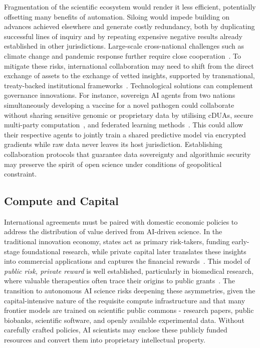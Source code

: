 \documentclass[11pt, a4paper, twocolumn, goog]{google}
\begin{document}
Fragmentation of the scientific ecosystem would render it less efficient, potentially offsetting many benefits of automation. Siloing would impede building on advances achieved elsewhere and generate costly redundancy, both by duplicating successful lines of inquiry and by repeating expensive negative results already established in other jurisdictions. Large-scale cross-national challenges such as climate change and pandemic response further require close cooperation~\citep{gluckman2017science}. To mitigate these risks, international collaboration may need to shift from the direct exchange of assets to the exchange of vetted insights, supported by transnational, treaty-backed institutional frameworks~\citep{taeihagh2021governance, johnson2021survey, emery2025international}. Technological solutions can complement governance innovations. For instance, sovereign AI agents from two nations simultaneously developing a vaccine for a novel pathogen could collaborate without sharing sensitive genomic or proprietary data by utilising cDUAs, secure multi-party computation~\citep{zhao2019secure, knott2021crypten}, and federated learning methods~\citep{rieke2020future}. This could allow their respective agents to jointly train a shared predictive model via encrypted gradients while raw data never leaves its host jurisdiction. Establishing collaboration protocols that guarantee data sovereignty and algorithmic security may preserve the spirit of open science under conditions of geopolitical constraint.

\subsection{Compute and Capital}

International agreements must be paired with domestic economic policies to address the distribution of value derived from AI-driven science. In the traditional innovation economy, states act as primary risk-takers, funding early-stage foundational research, while private capital later translates these insights into commercial applications and captures the financial rewards~\citep{yencha2015entrepreneurial}. This model of \emph{public risk, private reward} is well established, particularly in biomedical research, where valuable therapeutics often trace their origins to public grants~\citep{galkina2018contribution}. The transition to autonomous AI science risks deepening these asymmetries, given the capital-intensive nature of the requisite compute infrastructure and that many frontier models are trained on scientific public commons - research papers, public biobanks, scientific software, and openly available experimental data. Without carefully crafted policies, AI scientists may enclose these publicly funded resources and convert them into proprietary intellectual property. 
\end{document}
